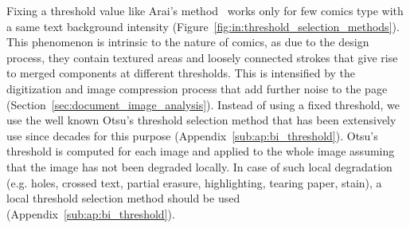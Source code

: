 
Fixing a threshold value like Arai's method~\cite{Arai11} works only for few comics type with a same text background intensity (Figure~\ref{fig:in:threshold_selection_methods}).
This phenomenon is intrinsic to the nature of comics, as due to the design process, they contain textured areas and loosely connected strokes that give rise to merged components at different thresholds.
This is intensified by the digitization and image compression process that add further noise to the page (Section~\ref{sec:document_image_analysis}).
Instead of using a fixed threshold, we use the well known Otsu's threshold selection method that has been extensively use since decades for this purpose (Appendix~\ref{sub:ap:bi_threshold}).
Otsu's threshold is computed for each image and applied to the whole image assuming that the image has not been degraded locally.
In case of such local degradation (e.g. holes, crossed text, partial erasure, highlighting, tearing paper, stain), a local threshold selection method should be used (Appendix~\ref{sub:ap:bi_threshold}).


